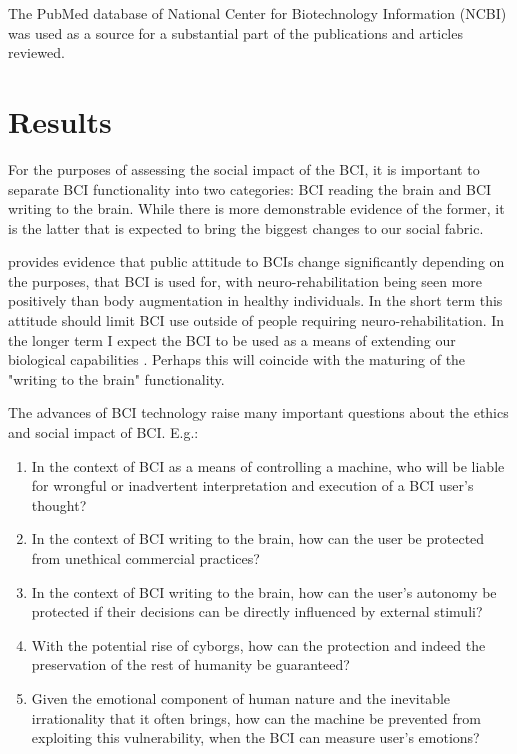 \documentclass[fleqn,11pt]{olplainarticle}
\begin{document}
The PubMed database of  National Center for Biotechnology Information (NCBI) was used as a source for a substantial part of the publications and articles reviewed.

\section{Results} \label{results}
For the purposes of assessing the social impact of the BCI, it is important to separate BCI functionality into two categories: BCI reading the brain and BCI writing to the brain. While there is more demonstrable evidence of the former, it is the latter that is expected to bring the biggest changes to our social fabric. 

\cite{meyer2018disabled} provides evidence that public attitude to BCIs change significantly depending on the purposes, that BCI is used for, with neuro-rehabilitation being seen more positively than body augmentation in healthy individuals. In the short term this attitude should limit BCI use outside of people requiring neuro-rehabilitation. In the longer term I expect the BCI to be used as a means of extending our biological capabilities \cite{warwick2003cyborg}. Perhaps this will coincide with the maturing of the "writing to the brain" functionality.

The advances of BCI technology raise many important questions about the ethics and social impact of BCI. E.g.:
\begin{enumerate}
    \item In the context of BCI as a means of controlling a machine, who will be liable for wrongful or inadvertent interpretation and execution of a BCI user's thought?
    \item In the context of BCI writing to the brain, how can the user be protected from unethical commercial practices?
    \item In the context of BCI writing to the brain, how can the user's autonomy be protected if their decisions can be directly influenced by external stimuli?
    \item With the potential rise of cyborgs, how can the protection and indeed the preservation of the rest of humanity be guaranteed?
    \item Given the emotional component of human nature and the inevitable irrationality that it often brings, how can the machine be prevented from exploiting this vulnerability, when the BCI can measure user's emotions? 
\end{enumerate}
\end{document}
